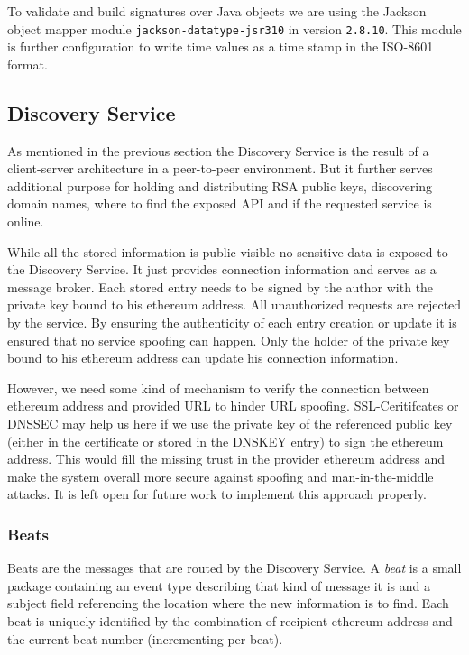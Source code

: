 To validate and build signatures over Java objects we are using the Jackson object mapper module \lstinline{jackson-datatype-jsr310} in version \lstinline{2.8.10}. This module is further configuration to write time values as a time stamp in the ISO-8601 format. 

\subsection{Discovery Service}
\label{sec:discoveryService}
As mentioned in the previous section the Discovery Service is the result of a client-server architecture in a peer-to-peer environment. But it further serves additional purpose for holding and distributing RSA public keys, discovering domain names, where to find the exposed API and if the requested service is online. 

While all the stored information is public visible no sensitive data is exposed to the Discovery Service. It just provides connection information and serves as a message broker. Each stored entry needs to be signed by the author with the private key bound to his ethereum address. All unauthorized requests are rejected by the service. By ensuring the authenticity of each entry creation or update it is ensured that no service spoofing can happen. Only the holder of the private key bound to his ethereum address can update his connection information.

However, we need some kind of mechanism to verify the connection between ethereum address and provided URL to hinder URL spoofing. SSL-Ceritifcates or DNSSEC may help us here if we use the private key of the referenced public key (either in the certificate or stored in the DNSKEY entry) to sign the ethereum address. This would fill the missing trust in the provider ethereum address and make the system overall more secure against spoofing and man-in-the-middle attacks. It is left open for future work to implement this approach properly. 

\subsubsection{Beats}
\label{sec:beats}
Beats are the messages that are routed by the Discovery Service. A \textit{beat} is a small package containing an event type describing that kind of message it is and a subject field referencing the location where the new information is to find. Each beat is uniquely identified by the combination of recipient ethereum address and the current beat number (incrementing per beat). 

